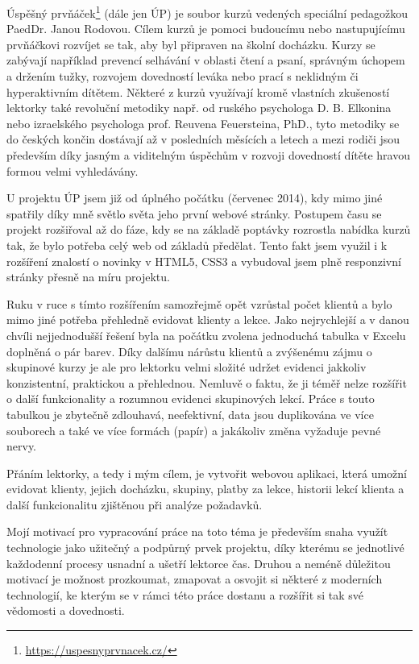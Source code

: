 Úspěšný prvňáček\footnote{\url{https://uspesnyprvnacek.cz/}} (dále jen ÚP) je soubor kurzů vedených speciální pedagožkou PaedDr. Janou Rodovou. Cílem kurzů je pomoci budoucímu nebo nastupujícímu prvňáčkovi rozvíjet se tak, aby byl připraven na školní docházku. Kurzy se zabývají například prevencí selhávání v oblasti čtení a psaní, správným úchopem a držením tužky, rozvojem dovedností leváka nebo prací s neklidným či hyperaktivním dítětem. Některé z kurzů využívají kromě vlastních zkušeností lektorky také revoluční metodiky např. od ruského psychologa D. B. Elkonina nebo izraelského psychologa prof. Reuvena Feuersteina, PhD., tyto metodiky se do českých končin dostávají až v posledních měsících a letech a mezi rodiči jsou především díky jasným a viditelným úspěchům v rozvoji dovedností dítěte hravou formou velmi vyhledávány.

U projektu ÚP jsem již od úplného počátku (červenec 2014), kdy mimo jiné spatřily díky mně světlo světa jeho první webové stránky. Postupem času se projekt rozšiřoval až do fáze, kdy se na základě poptávky rozrostla nabídka kurzů tak, že bylo potřeba celý web od základů předělat. Tento fakt jsem využil i k rozšíření znalostí o novinky v HTML5, CSS3 a vybudoval jsem plně responzivní stránky přesně na míru projektu.

Ruku v ruce s tímto rozšířením samozřejmě opět vzrůstal počet klientů a bylo mimo jiné potřeba přehledně evidovat klienty a lekce. Jako nejrychlejší a v danou chvíli nejjednodušší řešení byla na počátku zvolena jednoduchá tabulka v Excelu doplněná o pár barev. Díky dalšímu nárůstu klientů a zvýšenému zájmu o skupinové kurzy je ale pro lektorku velmi složité udržet evidenci jakkoliv konzistentní, praktickou a přehlednou. Nemluvě o faktu, že ji téměř nelze rozšířit o další funkcionality a rozumnou evidenci skupinových lekcí. Práce s touto tabulkou je zbytečně zdlouhavá, neefektivní, data jsou duplikována ve více souborech a také ve více formách (papír) a jakákoliv změna vyžaduje pevné nervy.

Přáním lektorky, a tedy i mým cílem, je vytvořit webovou aplikaci, která umožní evidovat klienty, jejich docházku, skupiny, platby za lekce, historii lekcí klienta a další funkcionalitu zjištěnou při analýze požadavků.

Mojí motivací pro vypracování práce na toto téma je především snaha využít technologie jako užitečný a podpůrný prvek projektu, díky kterému se jednotlivé každodenní procesy usnadní a ušetří lektorce čas. Druhou a neméně důležitou motivací je možnost prozkoumat, zmapovat a osvojit si některé z moderních technologií, ke kterým se v rámci této práce dostanu a rozšířit si tak své vědomosti a dovednosti.

